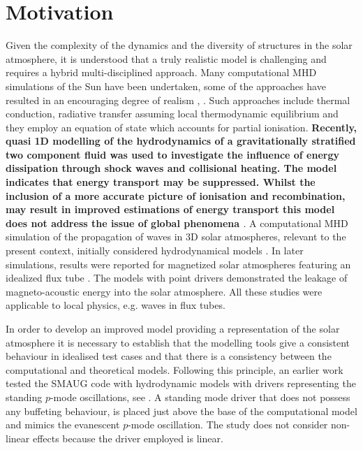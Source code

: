 \documentclass[physics,article,submit,pdftex,moreauthors]{Definitions/mdpi}
\begin{document}
\section{Motivation}
\label{sec:motivation}

Given the complexity of the dynamics and the diversity of structures in the solar atmosphere, it is understood that a truly realistic model is challenging and  requires a hybrid multi-disciplined approach. Many computational MHD simulations of the Sun have been undertaken, some of the approaches have resulted in an encouraging degree of realism  \cite{Vogler2005}, \cite{Gudiksen2011}. Such approaches include thermal conduction, radiative transfer assuming local thermodynamic equilibrium and they employ an equation of state which accounts for partial ionisation. {\bf Recently, quasi 1D modelling of the hydrodynamics of a gravitationally stratified two component fluid was used to investigate the influence of energy dissipation through shock waves and collisional heating. The model indicates that energy transport may be suppressed. Whilst the inclusion of a more accurate picture of ionisation and recombination, may result in improved estimations of energy transport this model does not address the issue of global phenomena \cite{Zhang2021}}. A computational MHD simulation of the propagation of waves in 3D solar atmospheres, relevant to the present context, initially considered hydrodynamical models \cite{Fedun2009a}.  In later simulations, 
 results were reported for magnetized solar atmospheres featuring an idealized flux tube \cite{Fedun2009b} \cite{Vigeesh2012}. The models with point drivers demonstrated the leakage of magneto-acoustic energy into the solar atmosphere. All these studies were applicable to local physics, e.g. waves in flux tubes.   

In order to develop an improved model providing a representation of the solar atmosphere it is necessary to establish that the modelling tools give a consistent behaviour in idealised test cases and that there is a consistency between the computational and theoretical models.  Following this principle, an earlier work tested the SMAUG code with hydrodynamic models with drivers representing the standing $p$-mode oscillations, see \cite{Griffiths2018b}. A standing mode driver that does not possess any buffeting behaviour, is placed just above the base of the computational model and mimics the evanescent $p$-mode oscillation. The study does not consider non-linear effects because the driver employed is linear.
\end{document}
